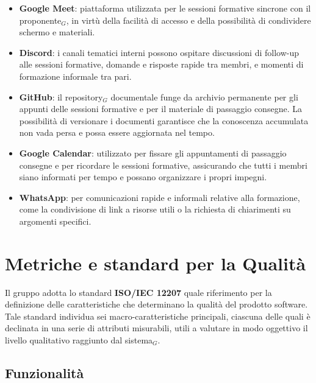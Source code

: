 \documentclass[a4paper, 10pt]{article}
\begin{document}
\begin{itemize}
    \item \textbf{Google Meet}: piattaforma utilizzata per le sessioni formative sincrone con il proponente$_G$, in virtù della facilità di accesso e della possibilità di condividere schermo e materiali.
    \item \textbf{Discord}: i canali tematici interni possono ospitare discussioni di follow-up alle sessioni formative, domande e risposte rapide tra membri, e momenti di formazione informale tra pari.
    \item \textbf{GitHub}: il repository$_G$ documentale funge da archivio permanente per gli appunti delle sessioni formative e per il materiale di passaggio consegne. La possibilità di versionare i documenti garantisce che la conoscenza accumulata non vada persa e possa essere aggiornata nel tempo.
    \item \textbf{Google Calendar}: utilizzato per fissare gli appuntamenti di passaggio consegne e per ricordare le sessioni formative, assicurando che tutti i membri siano informati per tempo e possano organizzare i propri impegni.
    \item \textbf{WhatsApp}: per comunicazioni rapide e informali relative alla formazione, come la condivisione di link a risorse utili o la richiesta di chiarimenti su argomenti specifici.
\end{itemize}

\section{Metriche e standard per la Qualità}
\label{sec:metriche_qualita}

Il gruppo adotta lo standard \textbf{ISO/IEC 12207} quale riferimento per la definizione delle caratteristiche che determinano la qualità del prodotto software. Tale standard individua sei macro-caratteristiche principali, ciascuna delle quali è declinata in una serie di attributi misurabili, utili a valutare in modo oggettivo il livello qualitativo raggiunto dal sistema$_G$.

\subsection{Funzionalità}
\label{subsec:funzionalita}
\end{document}
